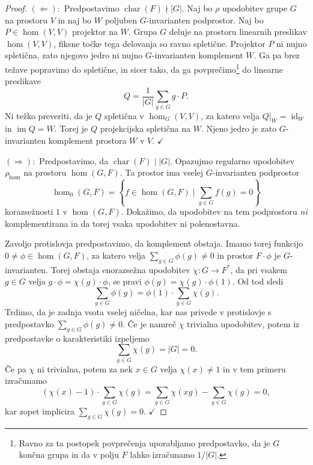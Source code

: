 \documentclass[11pt]{book}
\DeclareMathOperator\image{im}
\DeclareMathOperator\characteristic{char}
\DeclareMathOperator\id{id}
\def\kljuka{$\checkmark$}
\theoremstyle{definition}
\theoremstyle{zgled}
\theoremstyle{odprtproblem}
\theoremstyle{domacanaloga}
\newenvironment{dokaz}
    {\color{siva}\begin{proof}}
    {\end{proof}}
\theoremstyle{izrek}
\begin{document}
\begin{dokaz}
$(\Leftarrow):$ Predpostavimo $\characteristic(F) \nmid |G|$. Naj bo $\rho$ upodobitev grupe $G$ na prostoru $V$ in naj bo $W$ poljuben $G$-invarianten podprostor. Naj bo $P \in \hom(V,V)$ projektor na $W$. Grupa $G$ deluje na prostoru linearnih preslikav $\hom(V,V)$, fiksne točke tega delovanja so ravno spletične. Projektor $P$ ni nujno spletična, zato njegovo jedro ni nujno $G$-invarianten komplement $W$. Ga pa brez težave popravimo do spletične, in sicer tako, da ga povprečimo\footnote{Ravno za ta postopek povprečenja uporabljamo predpostavko, da je $G$ končna grupa in da v polju $F$ lahko izračunamo $1/|G|$.} do linearne preslikave
\[
    Q = \frac{1}{|G|} \sum_{g \in G} g \cdot P.
\]
Ni težko preveriti, da je $Q$ spletična v $\hom_G(V,V)$, za katero velja $Q|_W = \id_W$ in $\image Q = W$. Torej je $Q$ projekcijska spletična na $W$. Njeno jedro je zato $G$-invarianten komplement prostora $W$ v $V$. \kljuka

$(\Rightarrow):$ Predpostavimo, da $\characteristic(F) \mid |G|$. Opazujmo regularno upodobitev $\rho_{\hom}$ na prostoru $\hom(G,F)$. Ta prostor ima vselej $G$-invarianten podprostor
\[
    \displaystyle \hom_0(G,F) = \left\{ f \in \hom(G,F) \mid \sum_{g \in G} f(g) = 0 \right\}
\]
korazsežnosti $1$ v $\hom(G,F)$. Dokažimo, da upodobitev na tem podprostoru \emph{ni} komplementirana in da torej vsaka upodobitev ni polenostavna. 

Zavoljo protislovja predpostavimo, da komplement obstaja. Imamo torej funkcijo $0 \neq \phi \in \hom(G,F)$, za katero velja $\sum_{g \in G} \phi(g) \neq 0$ in prostor $F \cdot \phi$ je $G$-invarianten. Torej obstaja enorazsežna upodobitev $\chi \colon G \to F^*$, da pri vsakem $g \in G$ velja $g \cdot \phi = \chi(g) \cdot \phi$, se pravi $\phi(g) = \chi(g) \cdot \phi(1)$. Od tod sledi 
\[
    \sum_{g \in G} \phi(g) = \phi(1) \cdot \sum_{g \in G} \chi(g).
\]
Trdimo, da je zadnja vsota vselej ničelna, kar nas privede v protislovje s predpostavko $\sum_{g \in G} \phi(g) \neq 0$. Če je namreč $\chi$ trivialna upodobitev, potem iz predpostavke o karakteristiki izpeljemo
\[
    \sum_{g \in G} \chi(g) = |G| = 0.
\]
Če pa $\chi$ ni trivialna, potem za nek $x \in G$ velja $\chi(x) \neq 1$ in v tem primeru izračunamo
\[
    (\chi(x) - 1) \cdot \sum_{g \in G} \chi(g) = \sum_{g \in G} \chi(xg) - \sum_{g \in G} \chi(g) = 0,
\]
kar zopet implicira $\sum_{g \in G} \chi(g) = 0$. \kljuka
\end{dokaz}
\end{document}
